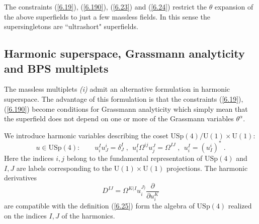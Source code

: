 \documentclass[a4paper,11pt]{article}
\begin{document}
The constraints (\ref{6.19}), (\ref{6.190}), (\ref{6.23}) and (\ref{6.24})
restrict the $\theta$ expansion of the above superfields to just a few massless
fields. In this sense the supersingletons are ``ultrashort" superfields.

\subsection{Harmonic superspace, Grassmann analyticity and BPS multiplets}

The massless multiplets {\sl (i)} admit an alternative formulation
in harmonic superspace. The advantage of this formulation is that
the constraints (\ref{6.19}), (\ref{6.190}) become conditions for
Grassmann analyticity which simply mean that the superfield does
not depend on one or more of the Grassmann variables
$\theta^\alpha$.

We introduce harmonic variables describing the coset
${\mbox{USp}}(4)/\mbox{U}(1)\times \mbox{U}(1)$:
\begin{equation}\label{6.25}
  u\in {\mbox{USp}}(4): \qquad u^I_iu^i_J = \delta^I_J\;,
\ \ u^I_i \Omega^{ij}u^J_j = \Omega^{IJ}\;, \ \  u^I_i= (u^i_I)^*\;.
\end{equation}
Here the indices $i,j$ belong to the fundamental representation of
${\mbox{USp}}(4)$ and $I,J$ are labels corresponding to the $\mbox{U}(1)\times
\mbox{U}(1)$ projections. The harmonic derivatives
\begin{equation}\label{6.26}
  D^{IJ} = \Omega^{K(I}u^{J)}_i \frac{\partial}{\partial u^K_i}
\end{equation}
are compatible with the definition (\ref{6.25}) form the algebra
of ${\mbox{USp}}(4)$ realized on the indices $I,J$ of the
harmonics.
\end{document}
